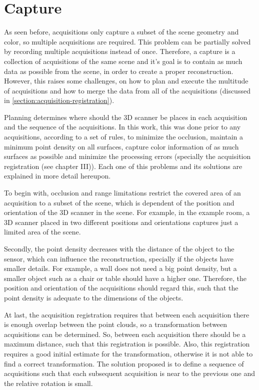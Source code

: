 \section{Capture}
\label{section:capture}

As seen before, acquisitions only capture a subset of the scene geometry and color, so multiple acquisitions are required. This problem can be partially solved by recording multiple acquisitions instead of once. Therefore, a capture is a collection of acquisitions of the same scene and it's goal is to contain as much data as possible from the scene, in order to create a proper reconstruction. However, this raises some challenges, on how to plan and execute the multitude of acquisitions and how to merge the data from all of the acquisitions (discussed in \cref{section:acquisition-registration}).

Planning determines where should the 3D scanner be places in each acquisition and the sequence of the acquisitions. In this work, this was done prior to any acquisitions, according to a set of rules, to minimize the occlusion, maintain a minimum point density on all surfaces, capture color information of as much surfaces as possible and minimize the processing errors (specially the acquisition registration (see chapter III)). Each one of this problems and its solutions are explained in more detail hereupon.

To begin with, occlusion and range limitations restrict the covered area of an acquisition to a subset of the scene, which is dependent of the position and orientation of the 3D scanner in the scene. For example, in the example room, a 3D scanner placed in two different positions and orientations captures just a limited area of the scene.

Secondly, the point density decreases with the distance of the object to the sensor, which can influence the reconstruction, specially if the objects have smaller details. For example, a wall does not need a big point density, but a smaller object such as a chair or table should have a higher one. Therefore, the position and orientation of the acquisitions should regard this, such that the point density is adequate to the dimensions of the objects.

At last, the acquisition registration requires that between each acquisition there is enough overlap between the point clouds, so a transformation between acquisitions can be determined. So, between each acquisition there should be a maximum distance, such that this registration is possible. Also, this registration requires a good initial estimate for the transformation, otherwise it is not able to find a correct transformation. The solution proposed is to define a sequence of acquisitions such that each subsequent acquisition is near to the previous one and the relative rotation is small.

